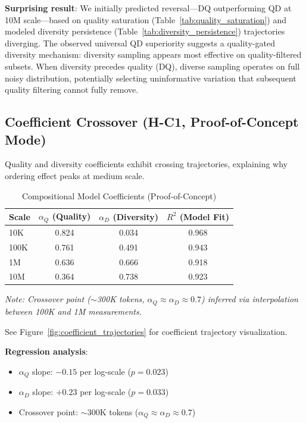 \textbf{Surprising result}: We initially predicted reversal---DQ outperforming QD at 10M scale---based on quality saturation (Table~\ref{tab:quality_saturation}) and modeled diversity persistence (Table~\ref{tab:diversity_persistence}) trajectories diverging. The observed universal QD superiority suggests a quality-gated diversity mechanism: diversity sampling appears most effective on quality-filtered subsets. When diversity precedes quality (DQ), diverse sampling operates on full noisy distribution, potentially selecting uninformative variation that subsequent quality filtering cannot fully remove.

\subsection{Coefficient Crossover (H-C1, Proof-of-Concept Mode)}

Quality and diversity coefficients exhibit crossing trajectories, explaining why ordering effect peaks at medium scale.

\begin{table}[t]
\centering
\caption{Compositional Model Coefficients (Proof-of-Concept)}
\label{tab:coefficients}
\begin{tabular}{@{}lccc@{}}
\toprule
Scale & $\alpha_Q$ (Quality) & $\alpha_D$ (Diversity) & $R^2$ (Model Fit) \\
\midrule
10K   & 0.824 & 0.034 & 0.968 \\
100K  & 0.761 & 0.491 & 0.943 \\
1M    & 0.636 & 0.666 & 0.918 \\
10M   & 0.364 & 0.738 & 0.923 \\
\bottomrule
\end{tabular}
\end{table}

\textit{Note: Crossover point ($\sim$300K tokens, $\alpha_Q \approx \alpha_D \approx 0.7$) inferred via interpolation between 100K and 1M measurements.}

See Figure~\ref{fig:coefficient_trajectories} for coefficient trajectory visualization.

\textbf{Regression analysis}:
\begin{itemize}
\item $\alpha_Q$ slope: $-0.15$ per log-scale ($p=0.023$)
\item $\alpha_D$ slope: $+0.23$ per log-scale ($p=0.033$)
\item Crossover point: $\sim$300K tokens ($\alpha_Q \approx \alpha_D \approx 0.7$)
\end{itemize}


